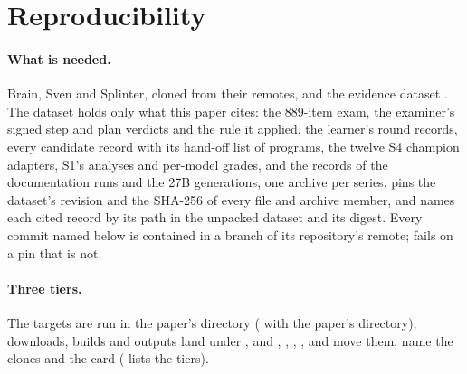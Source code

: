 
\section{Reproducibility}\label{sec:repro}

\paragraph{What is needed.} Brain, Sven and Splinter, cloned from their remotes, and the evidence
dataset . The dataset holds only what this
paper cites: the 889-item exam, the examiner's signed step and plan verdicts and the rule it applied,
the learner's round records, every candidate record with its hand-off list of programs, the twelve
S4 champion adapters, S1's analyses and per-model grades, and the records of the documentation runs
and the 27B generations, one archive per series.  pins the dataset's
revision and the SHA-256 of every file and archive member, and  names
each cited record by its path in the unpacked dataset and its digest. Every commit named below is
contained in a branch of its repository's remote;  fails on a pin that is not.

\paragraph{Three tiers.} The targets are run in the paper's directory
( with the paper's directory); downloads, builds and outputs land
under , and , , , ,
 and  move them, name the clones and the card ( lists
the tiers).

